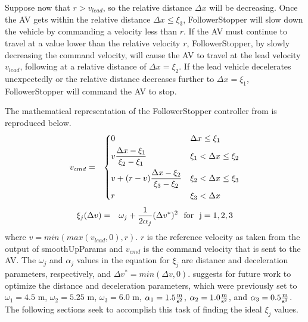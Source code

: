 \documentclass[conference]{IEEEtran}
\begin{document}
Suppose now that $r>v_{lead}$, so the relative distance $\Delta x$ will be decreasing. Once the AV gets within the relative distance $\Delta x \leq \xi_3$,  FollowerStopper will slow down the vehicle by commanding a velocity less than $r$. If the AV must continue to travel at a value lower than the relative velocity $r$, FollowerStopper, by slowly decreasing the command velocity, will cause the AV to travel at the lead velocity $v_{lead}$, following at a relative distance of $\Delta x=\xi_2$. If the lead vehicle decelerates unexpectedly or the relative distance decreases further to $\Delta x=\xi_1$, FollowerStopper will command the AV to stop.

The mathematical representation of the FollowerStopper controller from \cite{bhadani2019real} is reproduced below. 
\begin{eqnarray}
v_{cmd} &=& \begin{dcases}
        0 								& \Delta x\leq \xi_1 \\
        v{\Delta x-\xi_1\over\xi_2-\xi_1} 			& \xi_1< \Delta x\leq \xi_2 \\
        v+(r-v){\Delta x-\xi_2\over\xi_3-\xi_2}			& \xi_2< \Delta x\leq \xi_3 \\
        r 								& \xi_3< \Delta x \\
    \end{dcases}
\end{eqnarray}
\begin{eqnarray}
\xi_j(\Delta v)	&=& \omega_j + {1\over 2\alpha_j}(\Delta v^*)^2 \ \ {\rm for \ \ j=1, 2, 3}
\end{eqnarray}
where $v = min(max(v_{lead}, 0), r)$. $r$ is the reference velocity as taken from the output of smoothUpParams and $v_{cmd}$ is the command velocity that is sent to the AV. The $\omega_j$ and $\alpha_j$ values in the equation for $\xi_j$ are distance and deceleration parameters, respectively, and $\Delta v^*=min(\Delta v, 0)$. \cite{bhadani2019real} suggests for future work to optimize the distance and deceleration parameters, which were previously set to $\omega_1=4.5$ m, $\omega_2=5.25$ m, $\omega_3=6.0$ m, $\alpha_1=1.5 {\rm {m\over s^2}}$, $\alpha_2=1.0 {\rm {m\over s^2}}$, and $\alpha_3=0.5 {\rm {m\over s^2}}$. The following sections seek to accomplish this task of finding the ideal $\xi_j$ values.
\end{document}
